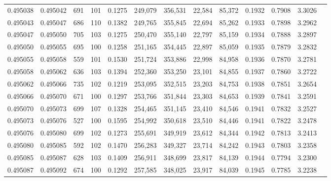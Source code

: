 \begin{tabular}{rrrrrrrrrrrrr}
0.495038 & 0.495042 &   691 & 101 &                                     0.1275 & 249,079 & 356,531 &  22,584 &  85,372 & 0.1932 & 0.7908 & 3.3026 \\
0.495043 & 0.495047 &   686 & 110 &                                     0.1382 & 249,765 & 355,845 &  22,694 &  85,262 & 0.1933 & 0.7898 & 3.2962 \\
0.495047 & 0.495050 &   705 & 103 &                                     0.1275 & 250,470 & 355,140 &  22,797 &  85,159 & 0.1934 & 0.7888 & 3.2897 \\
0.495050 & 0.495055 &   695 & 100 &                                     0.1258 & 251,165 & 354,445 &  22,897 &  85,059 & 0.1935 & 0.7879 & 3.2832 \\
0.495055 & 0.495058 &   559 & 101 &                                     0.1530 & 251,724 & 353,886 &  22,998 &  84,958 & 0.1936 & 0.7870 & 3.2781 \\
0.495058 & 0.495062 &   636 & 103 &                                     0.1394 & 252,360 & 353,250 &  23,101 &  84,855 & 0.1937 & 0.7860 & 3.2722 \\
0.495062 & 0.495066 &   735 & 102 &                                     0.1219 & 253,095 & 352,515 &  23,203 &  84,753 & 0.1938 & 0.7851 & 3.2654 \\
0.495066 & 0.495070 &   671 & 100 &                                     0.1297 & 253,766 & 351,844 &  23,303 &  84,653 & 0.1939 & 0.7841 & 3.2591 \\
0.495070 & 0.495073 &   699 & 107 &                                     0.1328 & 254,465 & 351,145 &  23,410 &  84,546 & 0.1941 & 0.7832 & 3.2527 \\
0.495073 & 0.495076 &   527 & 100 &                                     0.1595 & 254,992 & 350,618 &  23,510 &  84,446 & 0.1941 & 0.7822 & 3.2478 \\
0.495076 & 0.495080 &   699 & 102 &                                     0.1273 & 255,691 & 349,919 &  23,612 &  84,344 & 0.1942 & 0.7813 & 3.2413 \\
0.495080 & 0.495085 &   592 & 102 &                                     0.1470 & 256,283 & 349,327 &  23,714 &  84,242 & 0.1943 & 0.7803 & 3.2358 \\
0.495085 & 0.495087 &   628 & 103 &                                     0.1409 & 256,911 & 348,699 &  23,817 &  84,139 & 0.1944 & 0.7794 & 3.2300 \\
0.495087 & 0.495092 &   674 & 100 &                                     0.1292 & 257,585 & 348,025 &  23,917 &  84,039 & 0.1945 & 0.7785 & 3.2238 \\

\end{tabular}
